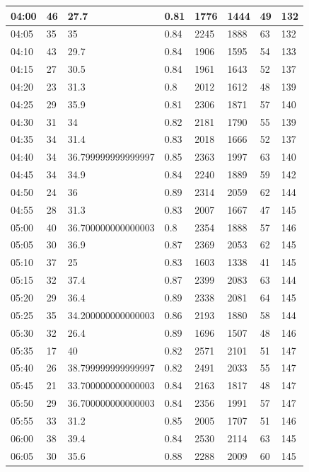 \documentclass[
]{book}
\begin{document}
\begin{tabular}{l|l|l|l|l|l|l|l}
\hline
04:00 & 46 & 27.7 & 0.81 & 1776 & 1444 & 49 & 132\\
\hline
04:05 & 35 & 35 & 0.84 & 2245 & 1888 & 63 & 132\\
\hline
04:10 & 43 & 29.7 & 0.84 & 1906 & 1595 & 54 & 133\\
\hline
04:15 & 27 & 30.5 & 0.84 & 1961 & 1643 & 52 & 137\\
\hline
04:20 & 23 & 31.3 & 0.8 & 2012 & 1612 & 48 & 139\\
\hline
04:25 & 29 & 35.9 & 0.81 & 2306 & 1871 & 57 & 140\\
\hline
04:30 & 31 & 34 & 0.82 & 2181 & 1790 & 55 & 139\\
\hline
04:35 & 34 & 31.4 & 0.83 & 2018 & 1666 & 52 & 137\\
\hline
04:40 & 34 & 36.799999999999997 & 0.85 & 2363 & 1997 & 63 & 140\\
\hline
04:45 & 34 & 34.9 & 0.84 & 2240 & 1889 & 59 & 142\\
\hline
04:50 & 24 & 36 & 0.89 & 2314 & 2059 & 62 & 144\\
\hline
04:55 & 28 & 31.3 & 0.83 & 2007 & 1667 & 47 & 145\\
\hline
05:00 & 40 & 36.700000000000003 & 0.8 & 2354 & 1888 & 57 & 146\\
\hline
05:05 & 30 & 36.9 & 0.87 & 2369 & 2053 & 62 & 145\\
\hline
05:10 & 37 & 25 & 0.83 & 1603 & 1338 & 41 & 145\\
\hline
05:15 & 32 & 37.4 & 0.87 & 2399 & 2083 & 63 & 144\\
\hline
05:20 & 29 & 36.4 & 0.89 & 2338 & 2081 & 64 & 145\\
\hline
05:25 & 35 & 34.200000000000003 & 0.86 & 2193 & 1880 & 58 & 144\\
\hline
05:30 & 32 & 26.4 & 0.89 & 1696 & 1507 & 48 & 146\\
\hline
05:35 & 17 & 40 & 0.82 & 2571 & 2101 & 51 & 147\\
\hline
05:40 & 26 & 38.799999999999997 & 0.82 & 2491 & 2033 & 55 & 147\\
\hline
05:45 & 21 & 33.700000000000003 & 0.84 & 2163 & 1817 & 48 & 147\\
\hline
05:50 & 29 & 36.700000000000003 & 0.84 & 2356 & 1991 & 57 & 147\\
\hline
05:55 & 33 & 31.2 & 0.85 & 2005 & 1707 & 51 & 146\\
\hline
06:00 & 38 & 39.4 & 0.84 & 2530 & 2114 & 63 & 145\\
\hline
06:05 & 30 & 35.6 & 0.88 & 2288 & 2009 & 60 & 145\\

\end{tabular}
\end{document}
